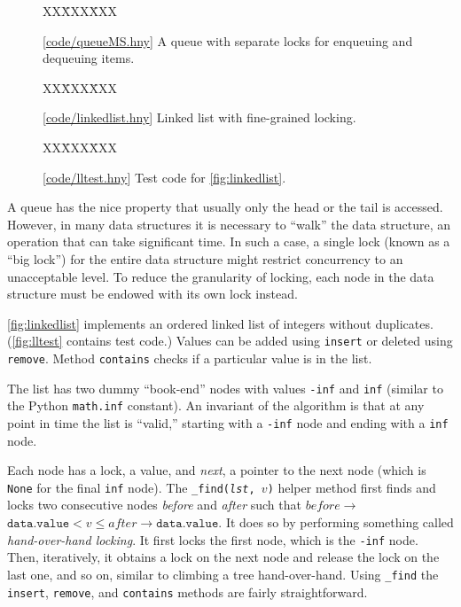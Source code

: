 \documentclass{report}
\newcommand{\harmonysource}[1]{
\begin{tabbing}
XX\=XXX\=XXX\kill
    
\end{tabbing}
}
\newcommand{\harmonylink}[1]{%
[\href{https://harmony.cs.cornell.edu/#1}{\underline{#1}}]%
}
\newenvironment{code}{
\tcolorbox
}{
\endtcolorbox
}
\begin{document}
\begin{figure}
\begin{code}
\harmonysource{queueMS}
\end{code}
\caption{\harmonylink{code/queueMS.hny} A queue with separate locks for enqueuing and dequeuing items.}
\label{fig:queueMS}
\end{figure}

\begin{figure}
\begin{code}
\harmonysource{linkedlist}
\end{code}
\caption{\harmonylink{code/linkedlist.hny} Linked list with fine-grained locking.}
\label{fig:linkedlist}
\end{figure}

\begin{figure}
\begin{code}
\harmonysource{lltest}
\end{code}
\caption{\harmonylink{code/lltest.hny} Test code for \autoref{fig:linkedlist}.}
\label{fig:lltest}
\end{figure}

%
%
%
%
A queue has the nice property that usually only the head or the tail is accessed.
However, in many data structures it is necessary to ``walk'' the data structure,
an operation that can take significant time.
In such a case, a single lock (known as a ``big lock'')
for the entire data structure might restrict concurrency to an unacceptable level.
To reduce the granularity of locking, each node in the data structure must be
endowed with its own lock instead.

\autoref{fig:linkedlist} implements an ordered linked
list of integers without duplicates.
(\autoref{fig:lltest} contains test code.)
Values can be added using \texttt{insert} or deleted using \texttt{remove}.
Method \texttt{contains} checks if a particular value is in the list.

The list has two dummy ``book-end'' nodes with values \texttt{-inf} and
\texttt{inf} (similar to the Python \texttt{math.inf} constant).
An invariant of the algorithm is that at any point in time the
list is ``valid,'' starting with a \texttt{-inf} node and ending
with a \texttt{inf} node.

%
Each node has a lock, a value, and \textit{next}, a pointer to the next node
(which is \texttt{None} for the final \texttt{inf} node).
The \texttt{\_find(\textit{lst}, $v$)} helper method first
finds and locks two consecutive nodes \textit{before} and \textit{after}
such that $\mathit{before}$$\rightarrow$$\mathtt{data.value} < v \le \mathit{after}$$\rightarrow$$\mathtt{data.value}$.
It does so by performing something called \emph{hand-over-hand locking}.
It first locks the first node, which is the \texttt{-inf} node.
Then, iteratively, it obtains a lock on the next node and release the
lock on the last one, and so on, similar to climbing a tree
hand-over-hand.
Using \texttt{\_find} the \texttt{insert}, \texttt{remove}, and \texttt{contains}
methods are fairly straightforward.
\end{document}
